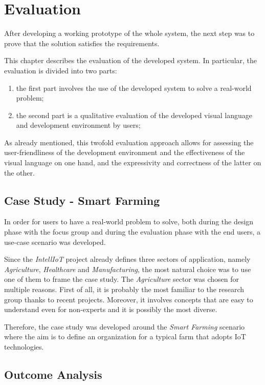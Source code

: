 \chapter{Evaluation}\label{chap:evaluation}
After developing a working prototype of the whole system, the next step was to prove that the solution satisfies the requirements.

This chapter describes the evaluation of the developed system.
In particular, the evaluation is divided into two parts:
\begin{enumerate}
    \item the first part involves the use of the developed system to solve a real-world problem;
    \item the second part is a qualitative evaluation of the developed visual language and development environment by users;
\end{enumerate}
As already mentioned, this twofold evaluation approach allows for assessing the user-friendliness of the development environment and the effectiveness of the visual language on one hand, and the expressivity and correctness of the latter on the other.

\section{Case Study - Smart Farming}
In order for users to have a real-world problem to solve, both during the design phase with the focus group and during the evaluation phase with the end users, a use-case scenario was developed.

Since the \textit{IntellIoT} project already defines three sectors of application, namely \textit{Agriculture}, \textit{Healthcare} and \textit{Manufacturing}, the most natural choice was to use one of them to frame the case study.
The \textit{Agriculture} sector was chosen for multiple reasons.
First of all, it is probably the most familiar to the research group thanks to recent projects.
Moreover, it involves concepts that are easy to understand even for non-experts and it is possibly the most diverse.

Therefore, the case study was developed around the \textit{Smart Farming} scenario where the aim is to define an organization for a typical farm that adopts IoT technologies.

\section{Outcome Analysis}